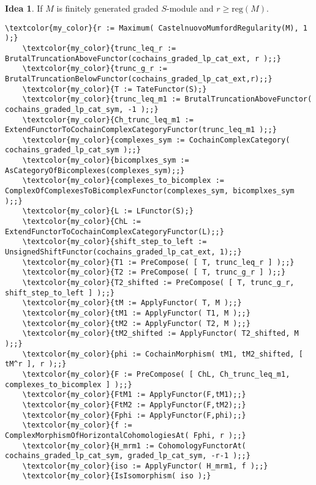 \documentclass[16pt,a4paper]{extarticle}
\theoremstyle{definition}
\newtheorem{idea}{Idea}
\theoremstyle{theorem}
\begin{document}
    \begin{idea}
        If $M$ is finitely generated graded $S$-module and $r\geq\mathrm{reg}(M)$.
    \end{idea}
    \begin{Verbatim}[commandchars=\\\{\}, fontseries=b, frame=single, label=Gap Code, framerule=0.5mm, rulecolor=\color{rule_color} ]
    \textcolor{my_color}{r := Maximum( CastelnuovoMumfordRegularity(M), 1 );}
    \textcolor{my_color}{trunc_leq_r := BrutalTruncationAboveFunctor(cochains_graded_lp_cat_ext, r );;}
    \textcolor{my_color}{trunc_g_r := BrutalTruncationBelowFunctor(cochains_graded_lp_cat_ext,r);;}
    \textcolor{my_color}{T := TateFunctor(S);}
    \textcolor{my_color}{trunc_leq_m1 := BrutalTruncationAboveFunctor( cochains_graded_lp_cat_sym, -1 );;}
    \textcolor{my_color}{Ch_trunc_leq_m1 := ExtendFunctorToCochainComplexCategoryFunctor(trunc_leq_m1 );;}
    \textcolor{my_color}{complexes_sym := CochainComplexCategory( cochains_graded_lp_cat_sym );;}
    \textcolor{my_color}{bicomplxes_sym := AsCategoryOfBicomplexes(complexes_sym);;}
    \textcolor{my_color}{complexes_to_bicomplex := ComplexOfComplexesToBicomplexFunctor(complexes_sym, bicomplxes_sym );;}
    \textcolor{my_color}{L := LFunctor(S);}
    \textcolor{my_color}{ChL := ExtendFunctorToCochainComplexCategoryFunctor(L);;}
    \textcolor{my_color}{shift_step_to_left := UnsignedShiftFunctor(cochains_graded_lp_cat_ext, 1);;}
    \textcolor{my_color}{T1 := PreCompose( [ T, trunc_leq_r ] );;}
    \textcolor{my_color}{T2 := PreCompose( [ T, trunc_g_r ] );;}    
    \textcolor{my_color}{T2_shifted := PreCompose( [ T, trunc_g_r, shift_step_to_left ] );;}
    \textcolor{my_color}{tM := ApplyFunctor( T, M );;}
    \textcolor{my_color}{tM1 := ApplyFunctor( T1, M );;}
    \textcolor{my_color}{tM2 := ApplyFunctor( T2, M );;}
    \textcolor{my_color}{tM2_shifted := ApplyFunctor( T2_shifted, M );;}
    \textcolor{my_color}{phi := CochainMorphism( tM1, tM2_shifted, [ tM^r ], r );;}
    \textcolor{my_color}{F := PreCompose( [ ChL, Ch_trunc_leq_m1, complexes_to_bicomplex ] );;}
    \textcolor{my_color}{FtM1 := ApplyFunctor(F,tM1);;}
    \textcolor{my_color}{FtM2 := ApplyFunctor(F,tM2);;}
    \textcolor{my_color}{Fphi := ApplyFunctor(F,phi);;}
    \textcolor{my_color}{f := ComplexMorphismOfHorizontalCohomologiesAt( Fphi, r );;}
    \textcolor{my_color}{H_mrm1 := CohomologyFunctorAt( cochains_graded_lp_cat_sym, graded_lp_cat_sym, -r-1 );;}
    \textcolor{my_color}{iso := ApplyFunctor( H_mrm1, f );;}
    \textcolor{my_color}{IsIsomorphism( iso );}

\end{Verbatim}
\end{document}
